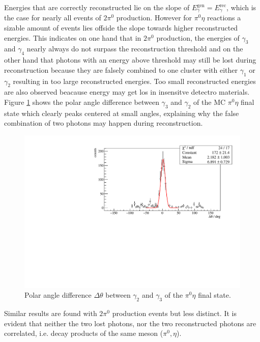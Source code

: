 Energies that are correctly reconstructed lie on the slope of $E_\gamma^\text{gen}=E_\gamma^\text{rec}$, which is the case for nearly all events of $2\pi^0$ production. However for $\pi^0\eta$ reactions a sizable amount of events lies offside the slope towards higher reconstructed energies. This indicates on one hand that in $2\pi^0$ production, the energies of  $\gamma_3$ and $\gamma_4$ nearly always do not surpass the reconstruction threshold and on the other hand that photons with an energy above threshold may still be lost during reconstruction because they are falsely combined to one cluster with either $\gamma_1$ or $\gamma_2$ resulting in too large reconstructed energies. Too small reconstructed energies are also observed beacause energy may get los in insensitve detectro materials. Figure \ref{fig:mcangle} shows the polar angle difference between $\gamma_3$ and $\gamma_2$ of the MC $\pi^0\eta$ final state which clearly peaks centered at small angles, explaining why the false combination of two photons may happen during reconstruction.
\begin{figure}[htbp]
	\centering
	\includegraphics[width=\linewidth]{../figs/hydrogen/mcgammas_td_pi0eta.pdf}
	\caption{Polar angle difference $\Delta\theta$ between $\gamma_2$ and $\gamma_3$ of the $\pi^0\eta$ final state.}
	\label{fig:mcangle}
\end{figure}
Similar results are found with $2\pi^0$ production events but less distinct. It is evident that neither the two lost photons, nor the two reconstructed photons are correlated, i.e. decay products of the same meson ($\pi^0,\eta$).

